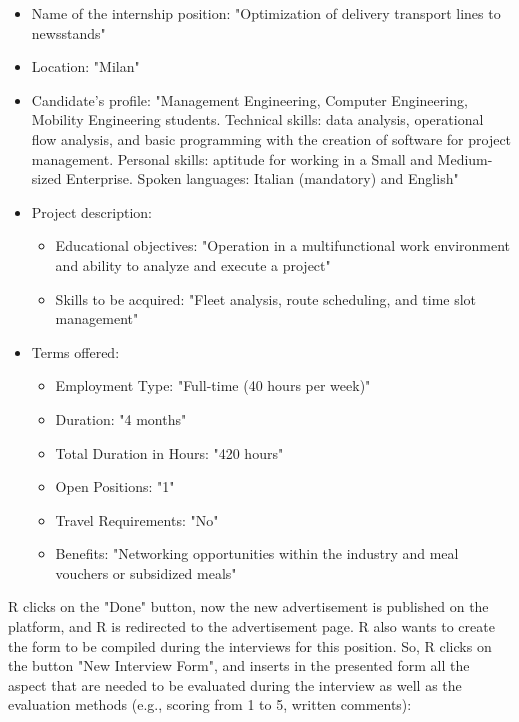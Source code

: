 \begin{itemize}
    \item Name of the internship position: "Optimization of delivery transport lines to newsstands"
    \item Location: "Milan"
    \item Candidate's profile: "Management Engineering, Computer Engineering, Mobility Engineering students. Technical skills: data analysis, operational flow analysis, and basic programming with the creation of software for project management. Personal skills: aptitude for working in a Small and Medium-sized Enterprise. Spoken languages: Italian (mandatory) and English"
    \item Project description:
    \begin{itemize}
        \item Educational objectives: "Operation in a multifunctional work environment and ability to analyze and execute a project"
        \item Skills to be acquired: "Fleet analysis, route scheduling, and time slot management"
    \end{itemize}
    \item Terms offered:
    \begin{itemize}
        \item Employment Type: "Full-time (40 hours per week)"
        \item Duration: "4 months"
        \item Total Duration in Hours: "420 hours"
        \item Open Positions: "1"
        \item Travel Requirements: "No"
        \item Benefits: "Networking opportunities within the industry and meal vouchers or subsidized meals"
    \end{itemize}
\end{itemize}
R clicks on the "Done" button, now the new advertisement is published on the platform, and R is redirected to the advertisement page.
R also wants to create the form to be compiled during the interviews for this position. So, R clicks on the button "New Interview Form", and inserts in the presented form all the aspect that are needed to be evaluated during the interview as well as the evaluation methods (e.g., scoring from 1 to 5, written comments):

